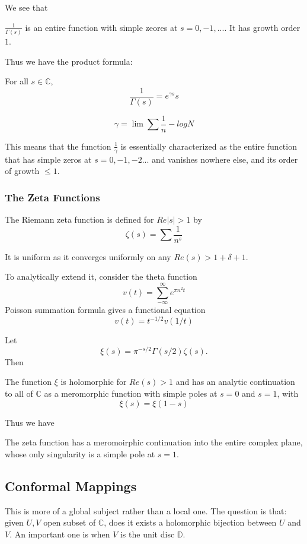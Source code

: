 \documentclass[main.tex]{subfiles}
\begin{document}
We see that 
\begin{theorem}
$\frac{1}{\Gamma(s)}$ is an entire function with simple zeores at $s = 0, -1, ...$. It has growth order $1$.
\end{theorem}

Thus we have the product formula:

\begin{theorem}
For all $s \in \mathbb{C}$, 
$$
\frac{1}{\Gamma(s)} = e^{\gamma s} s 
$$
\end{theorem}

$$\gamma = \lim \sum \frac{1}{n} - log N$$

This means that the function $\frac{1}{\gamma}$ is essentially characterized as the entire function that has simple zeros at $s = 0, -1, -2...$ and vanishes nowhere else, and its order of growth $\leq 1$.


\subsubsection{The Zeta Functions}

The Riemann zeta function is defined for $Re|s| > 1$ by 
$$
\zeta(s) = \sum \frac{1}{n^s}
$$

It is uniform as it converges uniformly on any $Re(s) > 1 + \delta + 1$.

To analytically extend it, consider the theta function 
$$
v(t) = \sum_{-\infty} ^{\infty} e^{\pi n^2 t}
$$
Poisson summation formula gives a functional equation 
$$
v(t) = t^{-1/2} v(1/t)
$$

Let 
$$
\xi(s) = \pi^{-s/2}\Gamma(s/2)\zeta(s).
$$
Then 
\begin{theorem}
The function $\xi$ is holomorphic for $Re(s) > 1$ and has an analytic continuation to all of $\mathbb{C}$ as a meromorphic function with simple poles at $s = 0$ and $s = 1$, with 
$$
\xi(s) = \xi(1-s)
$$
\end{theorem}

Thus we have 
\begin{theorem}
The zeta function has a meromoirphic continuation into the entire complex plane, whose only singularity is a simple pole at $s = 1$.
\end{theorem}


\subsection{Conformal Mappings}
This is more of a global subject rather than a local one. The question is that: given $U, V$ open subset of $\mathbb{C}$, does it exists a holomorphic bijection between $U$ and $V$. An important one is when $V$ is the unit disc $\mathbb{D}$.
\end{document}
